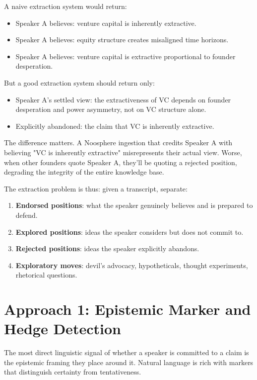 \documentclass[11pt,letterpaper]{article}
\begin{document}
A naive extraction system would return:
\begin{itemize}
  \item Speaker A believes: venture capital is inherently extractive.
  \item Speaker A believes: equity structure creates misaligned time horizons.
  \item Speaker A believes: venture capital is extractive proportional to founder desperation.
\end{itemize}

But a good extraction system should return only:
\begin{itemize}
  \item Speaker A's settled view: the extractiveness of VC depends on founder desperation and power asymmetry, not on VC structure alone.
  \item Explicitly abandoned: the claim that VC is inherently extractive.
\end{itemize}

The difference matters. A Noosphere ingestion that credits Speaker A with believing "VC is inherently extractive" misrepresents their actual view. Worse, when other founders quote Speaker A, they'll be quoting a rejected position, degrading the integrity of the entire knowledge base.

The extraction problem is thus: given a transcript, separate:
\begin{enumerate}
  \item \textbf{Endorsed positions}: what the speaker genuinely believes and is prepared to defend.
  \item \textbf{Explored positions}: ideas the speaker considers but does not commit to.
  \item \textbf{Rejected positions}: ideas the speaker explicitly abandons.
  \item \textbf{Exploratory moves}: devil's advocacy, hypotheticals, thought experiments, rhetorical questions.
\end{enumerate}

\section{Approach 1: Epistemic Marker and Hedge Detection}

The most direct linguistic signal of whether a speaker is committed to a claim is the epistemic framing they place around it. Natural language is rich with markers that distinguish certainty from tentativeness.
\end{document}
